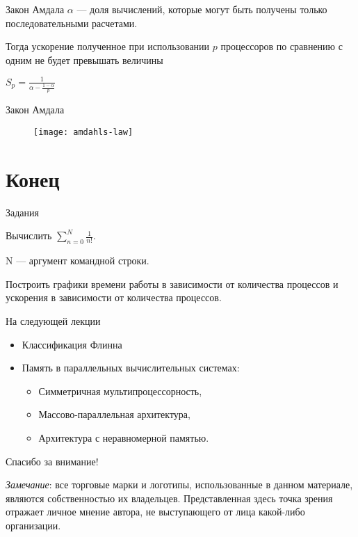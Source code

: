 \begin{frame}{Закон Амдала}
$\alpha$ --- доля вычислений, которые могут быть получены только
последовательными расчетами.

\bigskip

Тогда ускорение полученное при использовании $p$ процессоров по сравнению с
одним не будет превышать величины

\bigskip

$S_p =\frac{1}{\alpha - \frac{1 - \alpha}{p}}$
\end{frame}

\begin{frame}{Закон Амдала}
\begin{figure}
    \centering
    \texttt{[image: amdahls-law]}
\end{figure}
\end{frame}

\section*{Конец}

\begin{frame}{Задания}

Вычислить $\sum \limits_{n=0}^{N} \frac{1}{n!}$.

N --- аргумент командной строки.

Построить графики времени работы в зависимости от количества процессов и ускорения в зависимости от количества процессов.

\end{frame}

\begin{frame}{На следующей лекции}

\begin{itemize}
    \item Классификация Флинна
    \item Память в параллельных вычислительных системах:
    \begin{itemize}
        \item Симметричная мультипроцессорность,
        \item Массово-параллельная архитектура,
        \item Архитектура с неравномерной памятью.
    \end{itemize}
\end{itemize}

\end{frame}

\begin{frame}

{\huge{Спасибо за внимание!}\par}

\vfill

\tiny{\textit{Замечание}: все торговые марки и логотипы, использованные в данном материале, являются собственностью их владельцев. Представленная здесь точка зрения отражает личное мнение автора, не выступающего от лица какой-либо организации.}

\end{frame}


